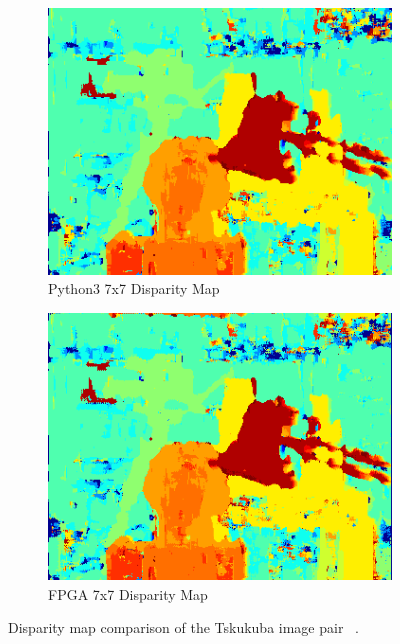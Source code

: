 \begin{figure}
\begin{center}
	\\
	\begin{subfigure}{0.45\textwidth}
		\includegraphics[width=\textwidth]{figures/tsukuba_7x7_python3.png}
		\caption{Python3 7x7 Disparity Map}
		\label{fig:tsukubaPy}
	\end{subfigure}
	\begin{subfigure}{0.45\textwidth}
		\includegraphics[width=\textwidth]{figures/tsukuba_7x7_fpga.png}
		\caption{FPGA 7x7 Disparity Map}
		\label{fig:tsukubaFPGA}
	\end{subfigure}
	\captionfonts
	\caption{Disparity map comparison of the Tskukuba image pair ~\cite{middlebury}.}
	\label{fig:tsukubaDispMap}
\end{center}
\end{figure}

